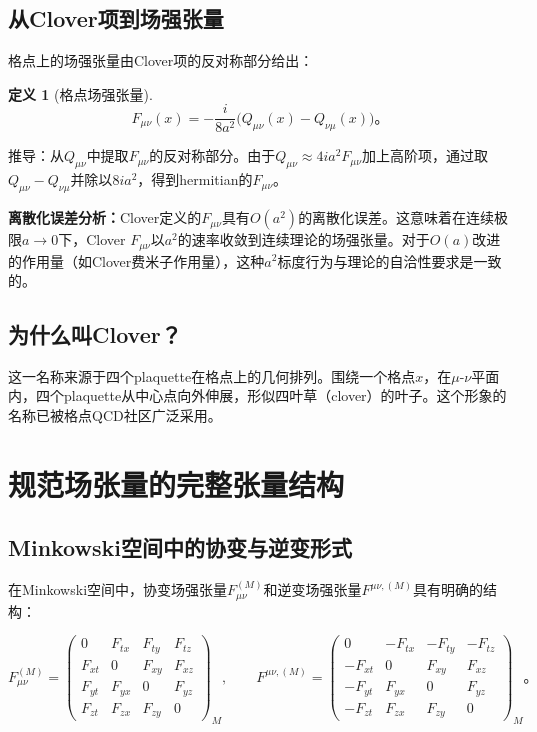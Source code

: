 \documentclass[12pt,a4paper]{ctexart}
\theoremstyle{definition}
\newtheorem{definition}{定义}[section]
\begin{document}
\subsection{从Clover项到场强张量}

格点上的场强张量由Clover项的反对称部分给出\cite{NoteGluonPDFs}：

\begin{definition}[格点场强张量]
\begin{equation}
\boxed{F_{\mu\nu}(x) = -\frac{i}{8a^2} \big(Q_{\mu\nu}(x) - Q_{\nu\mu}(x)\big)}。
\label{eq:F_from_clover}
\end{equation}
\end{definition}

推导：从$Q_{\mu\nu}$中提取$F_{\mu\nu}$的反对称部分。由于$Q_{\mu\nu} \approx 4ia^2F_{\mu\nu}$加上高阶项，通过取$Q_{\mu\nu} - Q_{\nu\mu}$并除以$8ia^2$，得到hermitian的$F_{\mu\nu}$。

\textbf{离散化误差分析：}Clover定义的$F_{\mu\nu}$具有$O(a^2)$的离散化误差。这意味着在连续极限$a \to 0$下，Clover $F_{\mu\nu}$以$a^2$的速率收敛到连续理论的场强张量。对于$O(a)$改进的作用量（如Clover费米子作用量），这种$a^2$标度行为与理论的自洽性要求是一致的。

\subsection{为什么叫Clover？}

这一名称来源于四个plaquette在格点上的几何排列。围绕一个格点$x$，在$\mu$-$\nu$平面内，四个plaquette从中心点向外伸展，形似四叶草（clover）的叶子。这个形象的名称已被格点QCD社区广泛采用。

\section{规范场张量的完整张量结构}

\subsection{Minkowski空间中的协变与逆变形式}

在Minkowski空间中，协变场强张量$F^{(M)}_{\mu\nu}$和逆变场强张量$F^{\mu\nu,(M)}$具有明确的结构\cite{NoteGluonPDFs}：

\begin{equation}
F^{(M)}_{\mu\nu} =
\begin{pmatrix}
0      & F_{tx} & F_{ty} & F_{tz} \\
F_{xt} & 0      & F_{xy} & F_{xz} \\
F_{yt} & F_{yx} & 0      & F_{yz} \\
F_{zt} & F_{zx} & F_{zy} & 0
\end{pmatrix}_{\!\!M}, \qquad
F^{\mu\nu,(M)} =
\begin{pmatrix}
0       & -F_{tx} & -F_{ty} & -F_{tz} \\
-F_{xt} & 0       & F_{xy}  & F_{xz}  \\
-F_{yt} & F_{yx}  & 0       & F_{yz}  \\
-F_{zt} & F_{zx}  & F_{zy}  & 0
\end{pmatrix}_{\!\!M}。
\label{eq:F_Minkowski}
\end{equation}
\end{document}
